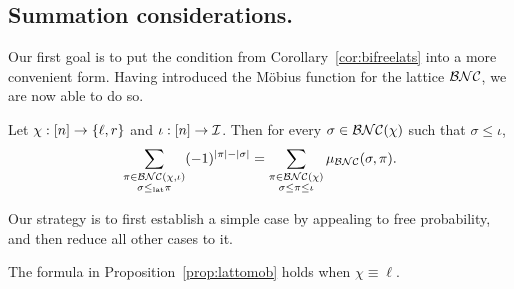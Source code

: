 \subsection{Summation considerations.}
Our first goal is to put the condition from Corollary~\ref{cor:bifreelats} into a more convenient form.
Having introduced the M\"obius function for the lattice $\mathcal{BNC}$, we are now able to do so.

\begin{proposition}
	\label{prop:lattomob}
	Let $\chi : [n] \to \left\{\ell, r\right\}$ and $\iota : [n] \to \mathcal{I}$.
	Then for every $\sigma \in \mathcal{BNC}(\chi)$ such that $\sigma \leq \iota$,
	$$\sum_{\substack{\pi\in\mathcal{BNC}(\chi, \iota)\\\sigma\leq_{{\operatorname{lat}}}\pi}} (-1)^{\left|\pi\right|-\left|\sigma\right|}
	= \sum_{\substack{\pi\in\mathcal{BNC}(\chi)\\\sigma\leq\pi\leq\iota}} \mu_{\mathcal{BNC}}(\sigma, \pi).$$
\end{proposition}

Our strategy is to first establish a simple case by appealing to free probability, and then reduce all other cases to it.

\begin{lemma}
	\label{lem:leftchiworks}
	The formula in Proposition~\ref{prop:lattomob} holds when $\chi \equiv \ell$.
\end{lemma}

